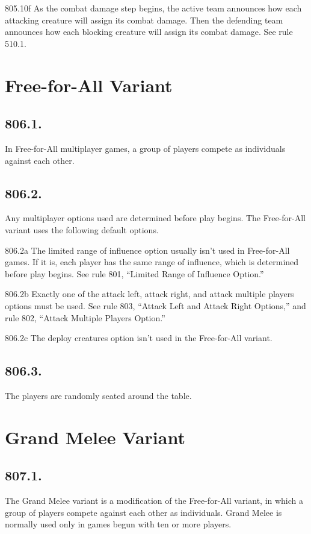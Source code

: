 805.10f As the combat damage step begins, the active team announces how each attacking creature will assign its combat damage. Then the defending team announces how each blocking creature will assign its combat damage. See rule 510.1.

\section{Free-for-All Variant}
\subsection*{806.1.}
In Free-for-All multiplayer games, a group of players compete as individuals against each other.

\subsection*{806.2.}
Any multiplayer options used are determined before play begins. The Free-for-All variant uses the following default options.

806.2a The limited range of influence option usually isn’t used in Free-for-All games. If it is, each player has the same range of influence, which is determined before play begins. See rule 801, “Limited Range of Influence Option.”

806.2b Exactly one of the attack left, attack right, and attack multiple players options must be used. See rule 803, “Attack Left and Attack Right Options,” and rule 802, “Attack Multiple Players Option.”

806.2c The deploy creatures option isn’t used in the Free-for-All variant.

\subsection*{806.3.}
The players are randomly seated around the table.

\section{Grand Melee Variant}
\subsection*{807.1.}
The Grand Melee variant is a modification of the Free-for-All variant, in which a group of players compete against each other as individuals. Grand Melee is normally used only in games begun with ten or more players.

